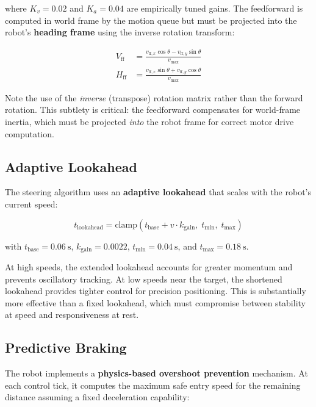 \documentclass[12pt, a4paper, twoside]{article}
\begin{document}
\noindent where $K_v = 0.02$ and $K_a = 0.04$ are empirically tuned gains. The feedforward is computed in world frame by the motion queue but must be projected into the robot's \textbf{heading frame} using the inverse rotation transform:

\begin{align}
    V_{\text{ff}} &= \frac{v_{\text{ff},x} \cos\theta - v_{\text{ff},y} \sin\theta}{v_{\max}} \\
    H_{\text{ff}} &= \frac{v_{\text{ff},x} \sin\theta + v_{\text{ff},y} \cos\theta}{v_{\max}}
\end{align}

\noindent Note the use of the \emph{inverse} (transpose) rotation matrix rather than the forward rotation. This subtlety is critical: the feedforward compensates for world-frame inertia, which must be projected \emph{into} the robot frame for correct motor drive computation.

\subsection{Adaptive Lookahead}

The steering algorithm uses an \textbf{adaptive lookahead} that scales with the robot's current speed:

\begin{equation}
    t_{\text{lookahead}} = \text{clamp}\!\left(t_{\text{base}} + v \cdot k_{\text{gain}},\; t_{\min},\; t_{\max}\right)
\end{equation}

\noindent with $t_{\text{base}} = \SI{0.06}{\second}$, $k_{\text{gain}} = 0.0022$, $t_{\min} = \SI{0.04}{\second}$, and $t_{\max} = \SI{0.18}{\second}$.

At high speeds, the extended lookahead accounts for greater momentum and prevents oscillatory tracking. At low speeds near the target, the shortened lookahead provides tighter control for precision positioning. This is substantially more effective than a fixed lookahead, which must compromise between stability at speed and responsiveness at rest.

\subsection{Predictive Braking}
\label{sec:pred-braking}

The robot implements a \textbf{physics-based overshoot prevention} mechanism. At each control tick, it computes the maximum safe entry speed for the remaining distance assuming a fixed deceleration capability:
\end{document}
